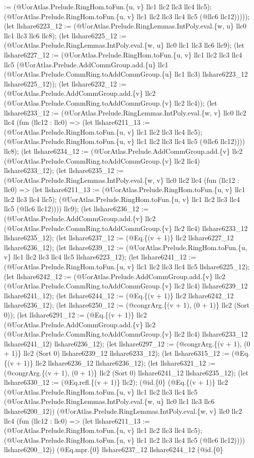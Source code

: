 \documentclass[11pt]{article}
\begin{document}
:= (@UorAtlas.Prelude.RingHom.toFun.\{u, v\} llc1 llc2 llc3 llc4 llc5); (@UorAtlas.Prelude.RingHom.toFun.\{u, v\} llc1 llc2 llc3 llc4 llc5 (@llc6 llc12))))); (let llshare6223\_12 := (@UorAtlas.Prelude.RingLemmas.IntPoly.eval.\{w, u\} llc0 llc1 llc3 llc6 llc8); (let llshare6225\_12 := (@UorAtlas.Prelude.RingLemmas.IntPoly.eval.\{w, u\} llc0 llc1 llc3 llc6 llc9); (let llshare6227\_12 := (@UorAtlas.Prelude.RingHom.toFun.\{u, v\} llc1 llc2 llc3 llc4 llc5 (@UorAtlas.Prelude.AddCommGroup.add.\{u\} llc1 (@UorAtlas.Prelude.CommRing.toAddCommGroup.\{u\} llc1 llc3) llshare6223\_12 llshare6225\_12)); (let llshare6232\_12 := (@UorAtlas.Prelude.AddCommGroup.add.\{v\} llc2 (@UorAtlas.Prelude.CommRing.toAddCommGroup.\{v\} llc2 llc4)); (let llshare6233\_12 := (@UorAtlas.Prelude.RingLemmas.IntPoly.eval.\{w, v\} llc0 llc2 llc4 (fun (llc12 : llc0) => (let llshare6211\_13 := (@UorAtlas.Prelude.RingHom.toFun.\{u, v\} llc1 llc2 llc3 llc4 llc5); (@UorAtlas.Prelude.RingHom.toFun.\{u, v\} llc1 llc2 llc3 llc4 llc5 (@llc6 llc12)))) llc8); (let llshare6234\_12 := (@UorAtlas.Prelude.AddCommGroup.add.\{v\} llc2 (@UorAtlas.Prelude.CommRing.toAddCommGroup.\{v\} llc2 llc4) llshare6233\_12); (let llshare6235\_12 := (@UorAtlas.Prelude.RingLemmas.IntPoly.eval.\{w, v\} llc0 llc2 llc4 (fun (llc12 : llc0) => (let llshare6211\_13 := (@UorAtlas.Prelude.RingHom.toFun.\{u, v\} llc1 llc2 llc3 llc4 llc5); (@UorAtlas.Prelude.RingHom.toFun.\{u, v\} llc1 llc2 llc3 llc4 llc5 (@llc6 llc12)))) llc9); (let llshare6236\_12 := (@UorAtlas.Prelude.AddCommGroup.add.\{v\} llc2 (@UorAtlas.Prelude.CommRing.toAddCommGroup.\{v\} llc2 llc4) llshare6233\_12 llshare6235\_12); (let llshare6237\_12 := (@Eq.\{(v + 1)\} llc2 llshare6227\_12 llshare6236\_12); (let llshare6239\_12 := (@UorAtlas.Prelude.RingHom.toFun.\{u, v\} llc1 llc2 llc3 llc4 llc5 llshare6223\_12); (let llshare6241\_12 := (@UorAtlas.Prelude.RingHom.toFun.\{u, v\} llc1 llc2 llc3 llc4 llc5 llshare6225\_12); (let llshare6242\_12 := (@UorAtlas.Prelude.AddCommGroup.add.\{v\} llc2 (@UorAtlas.Prelude.CommRing.toAddCommGroup.\{v\} llc2 llc4) llshare6239\_12 llshare6241\_12); (let llshare6244\_12 := (@Eq.\{(v + 1)\} llc2 llshare6242\_12 llshare6236\_12); (let llshare6250\_12 := (@congrArg.\{(v + 1), (0 + 1)\} llc2 (Sort 0)); (let llshare6291\_12 := (@Eq.\{(v + 1)\} llc2 (@UorAtlas.Prelude.AddCommGroup.add.\{v\} llc2 (@UorAtlas.Prelude.CommRing.toAddCommGroup.\{v\} llc2 llc4) llshare6233\_12 llshare6241\_12) llshare6236\_12); (let llshare6297\_12 := (@congrArg.\{(v + 1), (0 + 1)\} llc2 (Sort 0) llshare6239\_12 llshare6233\_12); (let llshare6315\_12 := (@Eq.\{(v + 1)\} llc2 llshare6236\_12 llshare6236\_12); (let llshare6321\_12 := (@congrArg.\{(v + 1), (0 + 1)\} llc2 (Sort 0) llshare6241\_12 llshare6235\_12); (let llshare6330\_12 := (@Eq.refl.\{(v + 1)\} llc2); (@id.\{0\} (@Eq.\{(v + 1)\} llc2 (@UorAtlas.Prelude.RingHom.toFun.\{u, v\} llc1 llc2 llc3 llc4 llc5 (@UorAtlas.Prelude.RingLemmas.IntPoly.eval.\{w, u\} llc0 llc1 llc3 llc6 llshare6200\_12)) (@UorAtlas.Prelude.RingLemmas.IntPoly.eval.\{w, v\} llc0 llc2 llc4 (fun (llc12 : llc0) => (let llshare6211\_13 := (@UorAtlas.Prelude.RingHom.toFun.\{u, v\} llc1 llc2 llc3 llc4 llc5); (@UorAtlas.Prelude.RingHom.toFun.\{u, v\} llc1 llc2 llc3 llc4 llc5 (@llc6 llc12)))) llshare6200\_12)) (@Eq.mpr.\{0\} llshare6237\_12 llshare6244\_12 (@id.\{0\} 
\end{document}
